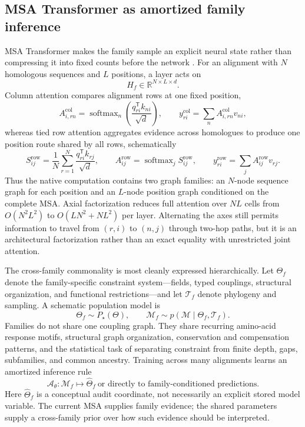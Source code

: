 \documentclass[10pt]{article}
\newcommand{\R}{\mathbb R}
\theoremstyle{definition}
\theoremstyle{remark}
\newcommand{\BookSection}[1]{\subsection{#1}}
\begin{document}
\BookSection{MSA Transformer as amortized family inference}

MSA Transformer makes the family sample an explicit neural state rather than compressing it into
fixed counts before the network \cite{rao2021}.  For an alignment with $N$ homologous sequences and
$L$ positions, a layer acts on
\begin{equation}
H_f\in\R^{N\times L\times d}.
\label{eq:msa-transformer-state}
\end{equation}
Column attention compares alignment rows at one fixed position,
\begin{equation}
A^{\mathrm{col}}_{i,rn}
=\operatorname{softmax}_{n}
\left(\frac{q_{ri}^{\mathsf T}k_{ni}}{\sqrt d}\right),
\qquad
y_{ri}^{\mathrm{col}}=\sum_nA^{\mathrm{col}}_{i,rn}v_{ni},
\label{eq:msa-column-attention}
\end{equation}
whereas tied row attention aggregates evidence across homologues to produce one position route
shared by all rows, schematically
\begin{equation}
S^{\mathrm{row}}_{ij}
=\frac1N\sum_{r=1}^N\frac{q_{ri}^{\mathsf T}k_{rj}}{\sqrt d},
\qquad
A^{\mathrm{row}}_{ij}=\operatorname{softmax}_{j}S^{\mathrm{row}}_{ij},
\qquad
y_{ri}^{\mathrm{row}}=\sum_jA^{\mathrm{row}}_{ij}v_{rj}.
\label{eq:msa-tied-row-attention}
\end{equation}
Thus the native computation contains two graph families: an $N$-node sequence graph for each
position and an $L$-node position graph conditioned on the complete MSA.  Axial factorization
reduces full attention over $NL$ cells from $O(N^2L^2)$ to
$O(LN^2+NL^2)$ per layer.  Alternating the axes still permits information to travel from
$(r,i)$ to $(n,j)$ through two-hop paths, but it is an architectural factorization rather than an
exact equality with unrestricted joint attention.

The cross-family commonality is most cleanly expressed hierarchically.  Let $\Theta_f$ denote the
family-specific constraint system---fields, typed couplings, structural organization, and
functional restrictions---and let $\mathcal T_f$ denote phylogeny and sampling.  A schematic
population model is
\begin{equation}
\Theta_f\sim P_\star(\Theta),
\qquad
\mathcal M_f\sim p(\mathcal M\mid\Theta_f,\mathcal T_f).
\label{eq:family-hierarchical-model}
\end{equation}
Families do not share one coupling graph.  They share recurring amino-acid response motifs,
structural graph organization, conservation and compensation patterns, and the statistical task of
separating constraint from finite depth, gaps, subfamilies, and common ancestry.  Training across
many alignments learns an amortized inference rule
\begin{equation}
\boxed{
\mathcal A_\theta:\mathcal M_f
\longmapsto
\widehat\Theta_f\ \text{or directly to family-conditioned predictions}.}
\label{eq:msa-amortized-family-map}
\end{equation}
Here $\widehat\Theta_f$ is a conceptual audit coordinate, not necessarily an explicit stored model
variable.  The current MSA supplies family evidence; the shared parameters supply a cross-family
prior over how such evidence should be interpreted.
\end{document}
